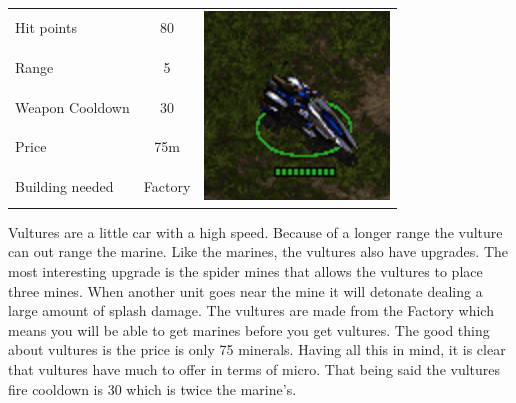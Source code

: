 \begin{table}[H]
	\begin{tabular}{| l | c | c}
		\cline{1-2}
		Hit points		& 80		&\multirow{5}{*}{\includegraphics[scale=.4]
									{Figures/Units/vulture.png}}	\\ \cline{1-2}
		Range			& 5 		&\\ \cline{1-2}
		Weapon Cooldown	& 30 		&\\ \cline{1-2}
		Price			& 75m		&\\ \cline{1-2}
		Building needed	& Factory	&\\ \cline{1-2}
	\end{tabular}
\end{table}

Vultures are a little car with a high speed. Because of a longer range the vulture can out range the marine. Like the marines, the
vultures also have upgrades. The most interesting upgrade is the spider mines that allows the vultures to place three mines. When another unit goes near the mine it will detonate dealing a large amount of splash damage. The vultures are made
from the Factory which means you will be able to get marines before you get vultures. The good thing about vultures is the price is only 75 minerals. Having all this in mind, it is clear that vultures have much to offer in terms of micro.
That being said the vultures fire cooldown is 30 which is twice the marine's.\cite{wiki_vulture}

